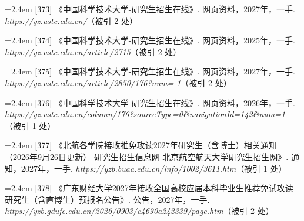 {\vspace{0.6pt}
\vspace{3.5pt}\par
\nopagebreak\vspace{1pt}
\noindent\hangindent=2.4em \label{src:S0496}{\color{cAccent}[373]} 《中国科学技术大学-研究生招生在线》. 网页资料，2027年，一手. \textit{https://yz.ustc.edu.cn/}（被引 2 处）\par
\vspace{0.6pt}
\noindent\hangindent=2.4em \label{src:S0497}{\color{cAccent}[374]} 《中国科学技术大学-研究生招生在线》. 网页资料，2025年，一手. \textit{https://yz.ustc.edu.cn/article/2715}（被引 2 处）\par
\vspace{0.6pt}
\noindent\hangindent=2.4em \label{src:S0498}{\color{cAccent}[375]} 《中国科学技术大学-研究生招生在线》. 网页资料，2027年，一手. \textit{https://yz.ustc.edu.cn/article/2850/176?num=-1}（被引 2 处）\par
\vspace{0.6pt}
\noindent\hangindent=2.4em \label{src:S0500}{\color{cAccent}[376]} 《中国科学技术大学-研究生招生在线》. 网页资料，2026年，一手. \textit{https://yz.ustc.edu.cn/column/176?sourceType=0\&navigationId=142\&num=1}（被引 1 处）\par
\vspace{0.6pt}
\vspace{3.5pt}\par
\nopagebreak\vspace{1pt}
\noindent\hangindent=2.4em \label{src:S0502}{\color{cAccent}[377]} 《北航各学院接收推免攻读2027年研究生（含博士）相关通知（2026年9月26日更新）-研究生招生信息网-北京航空航天大学研究生招生网》. 通知，2027年，一手. \textit{https://yzb.buaa.edu.cn/info/1002/3611.htm}（被引 1 处）\par
\vspace{0.6pt}
\vspace{3.5pt}\par
\nopagebreak\vspace{1pt}
\noindent\hangindent=2.4em \label{src:S0503}{\color{cAccent}[378]} 《广东财经大学2027年接收全国高校应届本科毕业生推荐免试攻读研究生（含直博生）预报名公告》. 公告，2027年，一手. \textit{https://yzb.gdufe.edu.cn/2026/0903/c4690a242339/page.htm}（被引 2 处）\par
}
